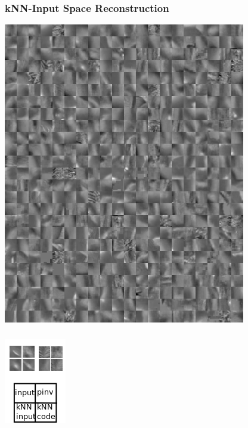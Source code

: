 \documentclass{beamer}
\begin{document}
\begin{frame}
\frametitle{kNN-Input Space Reconstruction} 
  \begin{center}
             \includegraphics[scale=0.5]{./figures/xnn.png} 
    \end{center}
\end{frame} 

\begin{frame}
\frametitle{} 
  \begin{center}
             \includegraphics[scale=1]{./figures/example.png} 
    \end{center}
\end{frame} 
\end{document}
